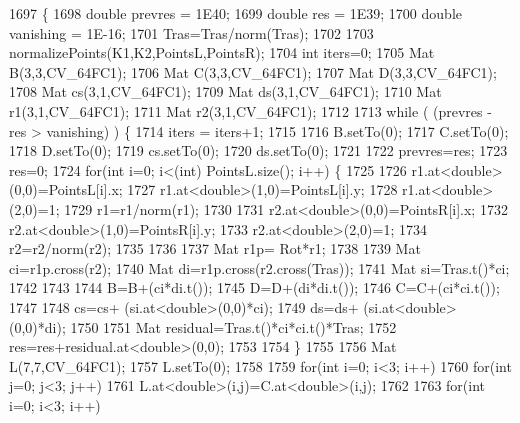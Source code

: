 \begin{DoxyCode}
1697                                                                                                            
              \{
1698     \textcolor{keywordtype}{double} prevres = 1E40;
1699     \textcolor{keywordtype}{double} res = 1E39;
1700     \textcolor{keywordtype}{double} vanishing = 1E-16;
1701     Tras=Tras/norm(Tras);
1702 
1703     normalizePoints(K1,K2,PointsL,PointsR);
1704     \textcolor{keywordtype}{int} iters=0;
1705     Mat B(3,3,CV\_64FC1);
1706     Mat C(3,3,CV\_64FC1);
1707     Mat D(3,3,CV\_64FC1);
1708     Mat cs(3,1,CV\_64FC1);
1709     Mat ds(3,1,CV\_64FC1);
1710     Mat r1(3,1,CV\_64FC1);
1711     Mat r2(3,1,CV\_64FC1);
1712 
1713     \textcolor{keywordflow}{while} ( (prevres  - res  >  vanishing) ) \{
1714         iters = iters+1;
1715 
1716         B.setTo(0);
1717         C.setTo(0);
1718         D.setTo(0);
1719         cs.setTo(0);
1720         ds.setTo(0);
1721 
1722         prevres=res;
1723         res=0;
1724         \textcolor{keywordflow}{for}(\textcolor{keywordtype}{int} i=0; i<(int) PointsL.size(); i++) \{
1725 
1726             r1.at<\textcolor{keywordtype}{double}>(0,0)=PointsL[i].x;
1727             r1.at<\textcolor{keywordtype}{double}>(1,0)=PointsL[i].y;
1728             r1.at<\textcolor{keywordtype}{double}>(2,0)=1;
1729             r1=r1/norm(r1);
1730 
1731             r2.at<\textcolor{keywordtype}{double}>(0,0)=PointsR[i].x;
1732             r2.at<\textcolor{keywordtype}{double}>(1,0)=PointsR[i].y;
1733             r2.at<\textcolor{keywordtype}{double}>(2,0)=1;
1734             r2=r2/norm(r2);
1735 
1736 
1737             Mat r1p= Rot*r1;
1738 
1739             Mat ci=r1p.cross(r2);
1740             Mat di=r1p.cross(r2.cross(Tras));
1741             Mat si=Tras.t()*ci;
1742 
1743 
1744             B=B+(ci*di.t());
1745             D=D+(di*di.t());
1746             C=C+(ci*ci.t());
1747 
1748             cs=cs+ (si.at<\textcolor{keywordtype}{double}>(0,0)*ci);
1749             ds=ds+ (si.at<\textcolor{keywordtype}{double}>(0,0)*di);
1750 
1751             Mat residual=Tras.t()*ci*ci.t()*Tras;
1752             res=res+residual.at<\textcolor{keywordtype}{double}>(0,0);
1753 
1754         \}
1755 
1756         Mat L(7,7,CV\_64FC1);
1757         L.setTo(0);
1758 
1759         \textcolor{keywordflow}{for}(\textcolor{keywordtype}{int} i=0; i<3; i++)
1760             \textcolor{keywordflow}{for}(\textcolor{keywordtype}{int} j=0; j<3; j++)
1761                 L.at<\textcolor{keywordtype}{double}>(i,j)=C.at<\textcolor{keywordtype}{double}>(i,j);
1762 
1763         \textcolor{keywordflow}{for}(\textcolor{keywordtype}{int} i=0; i<3; i++)

\end{DoxyCode}
